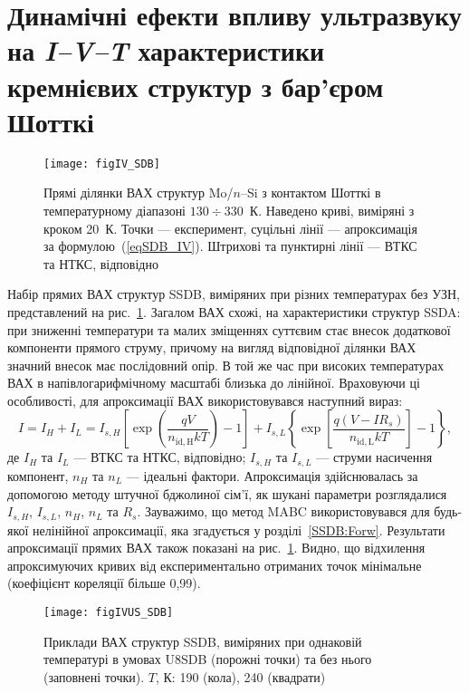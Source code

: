 \section{Динамічні ефекти впливу ультразвуку на \emph{I--V--T} характеристики кремнієвих структур з бар'єром Шотткі\label{SSDB:Forw}}

\begin{figure}[b]
\center
\texttt{[image: figIV\_SDB]}
\caption{\label{figIV_SDB}
Прямі  ділянки ВАХ структур Mo/$n$--Si з контактом Шотткі в температурному діапазоні $130\div330$~К.
Наведено криві, виміряні з кроком 20~К.
Точки --- експеримент,
суцільні лінії --- апроксимація за формулою~(\ref{eqSDB_IV}).
Штрихові та пунктирні лінії --- ВТКС та НТКС, відповідно
}%
\end{figure}


Набір прямих ВАХ структур  SSDB, виміряних при різних температурах без УЗН, представлений на рис.~\ref{figIV_SDB}.
Загалом ВАХ схожі, на характеристики структур SSDA:
при зниженні температури та малих зміщеннях суттєвим стає внесок додаткової компоненти прямого струму, причому
на вигляд відповідної ділянки ВАХ значний внесок має послідовний опір.
В той же час при високих температурах ВАХ в напівлогарифмічному масштабі близька до лінійної.
Враховуючи ці особливості, для апроксимації ВАХ використовувався наступний вираз:
\begin{equation}
\label{eqSDB_IV}
  I=I_H+I_L=I_{s,H}\left[\exp\left(\frac{qV}{n_\mathrm{id,H}kT}\right)-1\right]+
 I_{s,L}\left\{\exp\left[\frac{q(V-IR_s)}{n_\mathrm{id,L}kT}\right]-1\right\},
\end{equation}
де
$I_H$ та $I_L$ --- ВТКС та НТКС, відповідно;
$I_{s,H}$ та $I_{s,L}$ --- струми насичення компонент,
$n_{H}$ та $n_{L}$ --- ідеальні фактори.
Апроксимація здійснювалась за допомогою методу штучної бджолиної сім'ї,
як шукані параметри розглядалися $I_{s,H}$, $I_{s,L}$, $n_{H}$, $n_{L}$ та $R_s$.
Зауважимо, що метод MABC використовувався для будь-якої нелінійної апроксимації, яка згадується у розділі~\ref{SSDB:Forw}.
Результати апроксимації прямих ВАХ також показані на рис.~\ref{figIV_SDB}.
Видно, що відхилення апроксимуючих кривих від експериментально отриманих точок мінімальне
(коефіцієнт кореляції більше 0,99).

\begin{figure}
\center
\texttt{[image: figIVUS\_SDB]}
\caption{\label{figIVUS_SDB}
Приклади ВАХ структур SSDB, виміряних при однаковій температурі в умовах U8SDB (порожні точки) та без нього (заповнені точки).
$T$, К: 190 (кола), 240 (квадрати)
}%
\end{figure}

